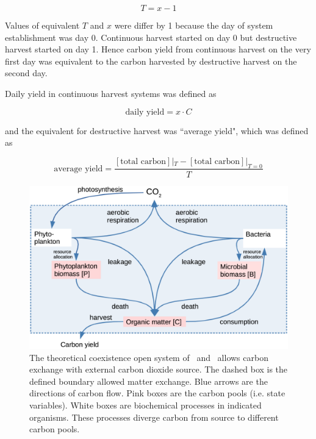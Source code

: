 \documentclass[../thesis.tex]{subfiles} %
\begin{document}
\begin{equation}
    T = x-1
    \label{eq:TvsX}
\end{equation}

Values of equivalent $T$ and $x$ were differ by 1 because the day of system establishment was day 0.  Continuous harvest started on day 0 but destructive harvest started on day 1.  Hence carbon yield from continuous harvest on the very first day was equivalent to the carbon harvested by destructive harvest on the second day.

Daily yield in continuous harvest systems was defined as

\begin{equation}
    \text{daily yield} = x\cdot C
    \label{eq:yield}
\end{equation}

and the equivalent for destructive harvest was ``average yield", which was defined as

\begin{equation}
    \text{average yield} = \dfrac{[\text{total carbon}]|_{T}-[\text{total carbon}]|_{T=0}}{T}
    \label{eq:avgYd}
\end{equation}

\begin{figure}[H]
    \centering
    \includegraphics[width=.8\linewidth]{media/model.png}
    \caption[Model visualization]{The theoretical coexistence open system of \phy\ and \bac\ allows carbon exchange with external carbon dioxide source.  The dashed box is the defined boundary allowed matter exchange.  Blue arrows are the directions of carbon flow.  Pink boxes are the carbon pools (i.e. state variables).  White boxes are biochemical processes in indicated organisms.  These processes diverge carbon from source to different carbon pools.}
    \label{f:model}
\end{figure}
\end{document}
